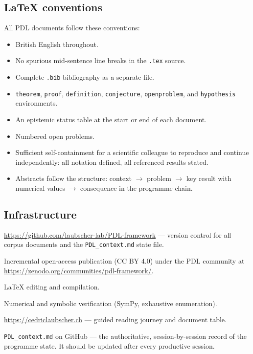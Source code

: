 \documentclass[11pt,a4paper]{article}
\theoremstyle{plain}
\theoremstyle{definition}
\theoremstyle{remark}
\begin{document}
\subsection{LaTeX conventions}
\label{subsec:latex}

All PDL documents follow these conventions:
\begin{itemize}
\item British English throughout.
\item No spurious mid-sentence line breaks in the \texttt{.tex} source.
\item Complete \texttt{.bib} bibliography as a separate file.
\item \texttt{theorem}, \texttt{proof}, \texttt{definition}, \texttt{conjecture}, \texttt{openproblem}, and \texttt{hypothesis} environments.
\item An epistemic status table at the start or end of each document.
\item Numbered open problems.
\item Sufficient self-containment for a scientific colleague to reproduce and continue independently: all notation defined, all referenced results stated.
\item Abstracts follow the structure: context $\to$ problem $\to$ key result with numerical values $\to$ consequence in the programme chain.
\end{itemize}

\subsection{Infrastructure}
\label{subsec:infra}

\begin{description}[leftmargin=2.5cm,style=nextline]
\item[GitHub] \url{https://github.com/laubscher-lab/PDL-framework} — version control for all corpus documents and the \texttt{PDL\_context.md} state file.
\item[Zenodo] Incremental open-access publication (CC BY 4.0) under the PDL community at \url{https://zenodo.org/communities/pdl-framework/}.
\item[Overleaf] LaTeX editing and compilation.
\item[Google Colab] Numerical and symbolic verification (SymPy, exhaustive enumeration).
\item[Website] \url{https://cedriclaubscher.ch} — guided reading journey and document table.
\item[State file] \texttt{PDL\_context.md} on GitHub — the authoritative, session-by-session record of the programme state.
It should be updated after every productive session.
\end{description}
\end{document}
